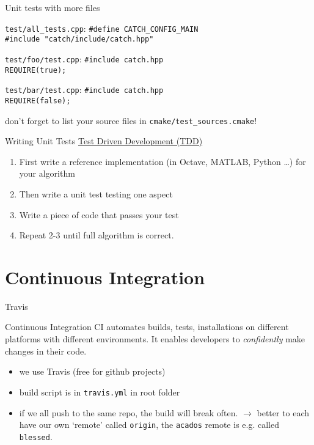 \documentclass[10pt]{beamer}
\begin{document}
\begin{frame}{Unit tests with more files}
	\begin{beamerboxesrounded}{\texttt{test/all\_tests.cpp}:}
		\texttt{\#define CATCH\_CONFIG\_MAIN} \\
		\texttt{\#include "catch/include/catch.hpp"}
	\end{beamerboxesrounded}
	\vspace{0.1cm}
	\begin{beamerboxesrounded}{\texttt{test/foo/test.cpp}:}
		\texttt{\#include catch.hpp} \\
		\texttt{REQUIRE(true);}
	\end{beamerboxesrounded}
	\vspace{0.1cm}
	\begin{beamerboxesrounded}{\texttt{test/bar/test.cpp}:}
		\texttt{\#include catch.hpp} \\
		\texttt{REQUIRE(false);}
	\end{beamerboxesrounded}
	\vspace{0.1cm}
	\centering don't forget to list your source files in \texttt{cmake/test\_sources.cmake}!
\end{frame}

\begin{frame}{Writing Unit Tests}
	\large \underline{Test Driven Development (TDD)}
	\begin{enumerate}
		\item First write a reference implementation (in Octave, MATLAB, Python \ldots) for your algorithm
		\item Then write a unit test testing one aspect
		\item Write a piece of code that passes your test
		\item Repeat 2-3 until full algorithm is correct.
	\end{enumerate}
\end{frame}

\section{Continuous Integration}

\begin{frame}{Travis}
	\begin{beamerboxesrounded}{Continuous Integration}
		CI automates builds, tests, installations on different platforms with different environments. It enables developers to \emph{confidently} make changes in their code.
	\end{beamerboxesrounded}
	\begin{itemize}
		\item we use Travis (free for github projects)
		\item build script is in \texttt{travis.yml} in root folder
		\item if we all push to the same repo, the build will break often. \newline $\rightarrow$ better to each have our own `remote' called \texttt{origin}, the \texttt{acados} remote is e.g. called \texttt{blessed}.
	\end{itemize}
\end{frame}
\end{document}
